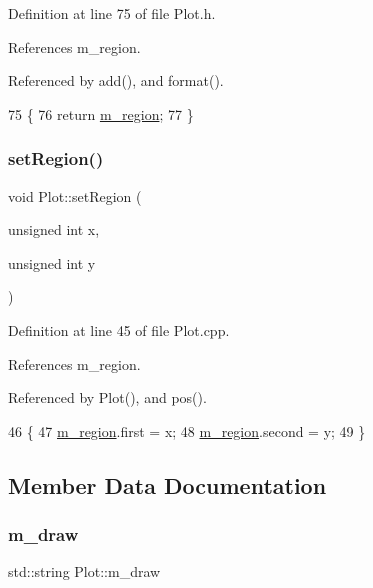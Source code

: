 Definition at line 75 of file Plot.\+h.



References m\+\_\+region.



Referenced by add(), and format().


\begin{DoxyCode}
75                                                 \{
76     \textcolor{keywordflow}{return} \hyperlink{classPlot_aabcbba1cfc66babcbcd647fdf90cdbf1}{m\_region};
77   \}
\end{DoxyCode}
\mbox{\label{classPlot_a77a015d72e98d6fb066481e9c70af1ec}} 
\subsubsection{\texorpdfstring{set\+Region()}{setRegion()}}
{\footnotesize\ttfamily void Plot\+::set\+Region (\begin{DoxyParamCaption}\item[{unsigned int}]{x,  }\item[{unsigned int}]{y }\end{DoxyParamCaption})}



Definition at line 45 of file Plot.\+cpp.



References m\+\_\+region.



Referenced by Plot(), and pos().


\begin{DoxyCode}
46                                         \{
47   \hyperlink{classPlot_aabcbba1cfc66babcbcd647fdf90cdbf1}{m\_region}.first  = x;
48   \hyperlink{classPlot_aabcbba1cfc66babcbcd647fdf90cdbf1}{m\_region}.second = y;
49 \}
\end{DoxyCode}


\subsection{Member Data Documentation}
\mbox{\label{classPlot_a83ffbf3effe6a2f8befa6375882f3994}} 
\subsubsection{\texorpdfstring{m\+\_\+draw}{m\_draw}}
{\footnotesize\ttfamily std\+::string Plot\+::m\+\_\+draw\hspace{0.3cm}{\ttfamily [private]}}



